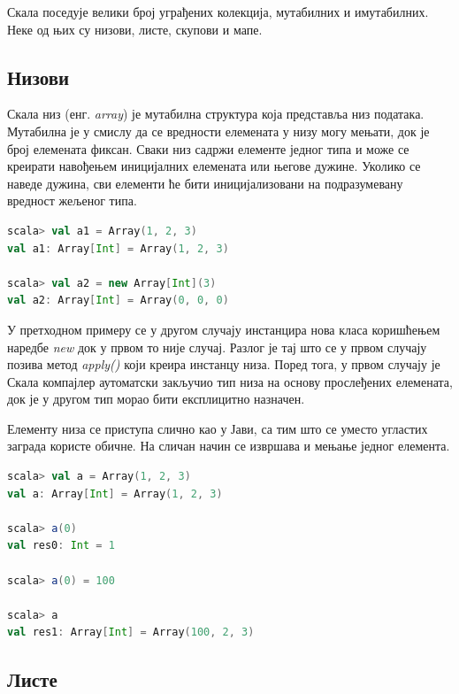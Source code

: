 \documentclass[12pt,oneside]{memoir}
\begin{document}
Скала поседује велики број уграђених колекција, мутабилних и имутабилних. Неке од њих су низови, листе, скупови и мапе.

\subsection{Низови}
\label{subsec:scala_arrays}

Скала низ (енг. \textit{array}) је мутабилна структура која представља низ података. Мутабилна је у смислу да се вредности елемената у низу могу мењати, док је број елемената фиксан. Сваки низ садржи елементе једног типа и може се креирати навођењем иницијалних елемената или његове дужине. Уколико се наведе дужина, сви елементи ће бити иницијализовани на подразумевану вредност жељеног типа. \cite{scala_prog}

\begin{lstlisting}[language=Scala, caption={Инстанцирање низа у Скали}, label={lst:scala_coll_array_example}]
scala> val a1 = Array(1, 2, 3)
val a1: Array[Int] = Array(1, 2, 3)

scala> val a2 = new Array[Int](3)
val a2: Array[Int] = Array(0, 0, 0)
\end{lstlisting}

У претходном примеру се у другом случају инстанцира нова класа коришћењем наредбе \textit{new} док у првом то није случај. Разлог је тај што се у првом случају позива метод \textit{apply()} који креира инстанцу низа. Поред тога, у првом случају је Скала компајлер аутоматски закључио тип низа на основу прослеђених елемената, док је у другом тип морао бити експлицитно назначен. \cite{scala_prog}

Елементу низа се приступа слично као у Јави, са тим што се уместо угластих заграда користе обичне. На сличан начин се извршава и мењање једног елемента.

\begin{lstlisting}[language=Scala, caption={Приступ и измена елемента низа}, label={lst:scala_coll_array_get_set}]
scala> val a = Array(1, 2, 3)
val a: Array[Int] = Array(1, 2, 3)

scala> a(0)
val res0: Int = 1

scala> a(0) = 100

scala> a
val res1: Array[Int] = Array(100, 2, 3)
\end{lstlisting}

\subsection{Листе}
\label{subsec:scala_lists}
\end{document}
